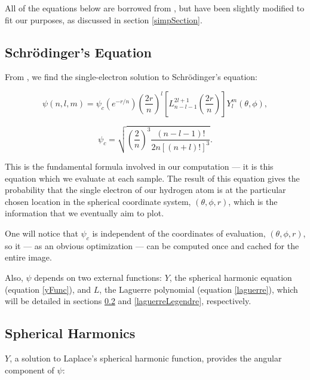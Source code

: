 \documentclass{acmsiggraph}
\begin{document}
All of the equations below are borrowed from \cite{quantumBook}, but have been slightly modified to fit our purposes, as discussed in section \ref{simpSection}.

\subsection{Schr\"{o}dinger's Equation}

From \cite{quantumBook}, we find the single-electron solution to Schr\"{o}dinger's equation:

\begin{equation}\label{psi}
\psi\left(n, l, m\right)=\psi_c
\left(\mathit{e}^{-r/n}\right)
\left(\frac{2r}{n}\right)^l
\left[L_{n-l-1}^{2l+1}
    \left(\frac{2r}{n}\right)\right]
Y_l^m\left(\theta,\phi\right),
\end{equation}

\begin{equation}\label{psiConstant}
\psi_c=\sqrt{\left(\frac{2}{n}\right)^3
    \frac{\left(n-l-1\right)!}{2n\left[\left(n+l\right)!\right]^3}}.
\end{equation}

This is the fundamental formula involved in our computation --- it is this equation which we evaluate at each sample. The result of this equation gives the probability that the single electron of our hydrogen atom is at the particular chosen location in the spherical coordinate system, $\left(\theta, \phi, r\right)$, which is the information that we eventually aim to plot.

One will notice that $\psi_c$ is independent of the coordinates of evaluation, $\left(\theta, \phi, r\right)$, so it --- as an obvious optimization --- can be computed once and cached for the entire image.

Also, $\psi$ depends on two external functions: $Y$, the spherical harmonic equation (equation \ref{yFunc}), and $L$, the Laguerre polynomial (equation \ref{laguerre}), which will be detailed in sections \ref{sphericalHarmonics} and \ref{laguerreLegendre}, respectively.

\subsection{Spherical Harmonics}

\label{sphericalHarmonics}

$Y$, a solution to Laplace's spherical harmonic function, provides the angular component of $\psi$:
\end{document}

